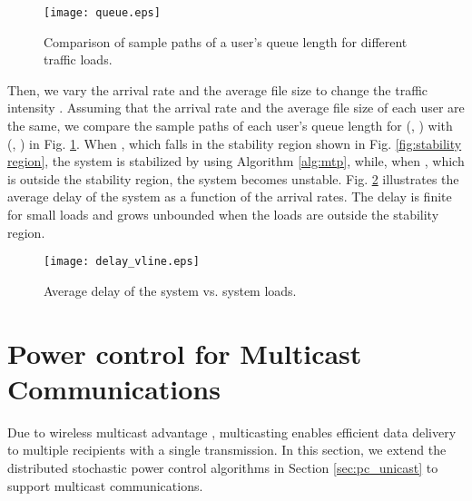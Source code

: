 \documentclass[10pt,journal,letterpaper,compsoc]{IEEEtran}
\begin{document}
{{\begin{figure}[t]
\begin{center}
\vspace{-0.0cm}\hspace{0cm} {\texttt{[image: queue.eps]}}\hspace{-0cm}
\vspace{0cm} \caption{Comparison of sample paths of a user's queue length for different traffic loads.}\vspace{-0.0cm}
\label{fig:queue}
\end{center}
\end{figure}


Then, we vary the arrival rate  and the average file size  to change the traffic intensity . Assuming that the arrival rate and the average file size of each user are the same, we compare the sample paths of each user's queue length for  (, ) with  (, ) in Fig. \ref{fig:queue}. When , which falls in the stability region shown in Fig. \ref{fig:stability region}, the system is stabilized by using Algorithm \ref{alg:mtp}, while, when , which is outside the stability region, the system becomes unstable. Fig. \ref{fig:delay} illustrates the average delay of the system as a function of the arrival rates. The delay is finite for small loads and grows unbounded when the loads are outside the stability region.

\begin{figure}[t]
\begin{center}
\vspace{-0.0cm}\hspace{0cm} {\texttt{[image: delay\_vline.eps]}}\hspace{-0cm}
\vspace{0cm} \caption{Average delay of the system vs. system loads.}\vspace{-0.0cm}
\label{fig:delay}
\end{center}
\end{figure}



\section{Power control for Multicast Communications}\label{sec:multicast}
Due to wireless multicast advantage \cite{wieselthier:2000}, multicasting enables efficient data delivery to multiple recipients with a single transmission. In this section, we extend the distributed stochastic power control algorithms in Section \ref{sec:pc_unicast} to support multicast communications.

}}
\end{document}
